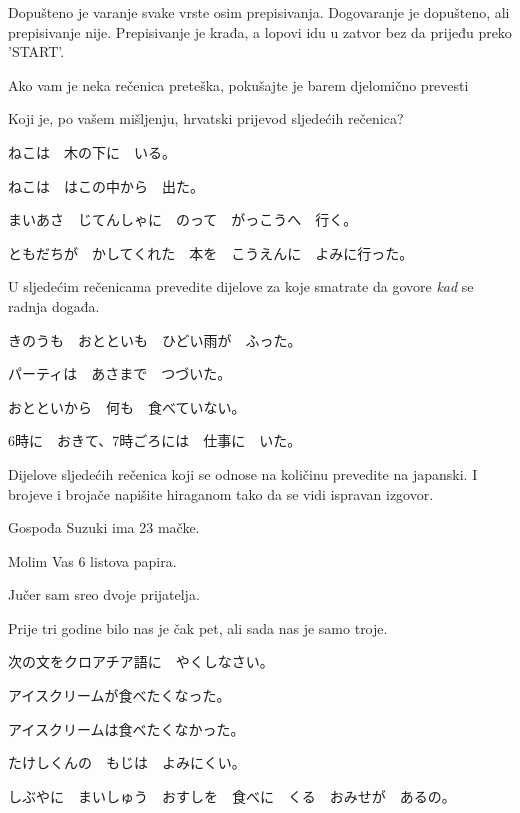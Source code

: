 
\author{Tomislav Mamić}

	
	\noindent
	Dopušteno je varanje svake vrste osim prepisivanja. Dogovaranje je dopušteno, ali prepisivanje nije. Prepisivanje je krađa, a lopovi idu u zatvor bez da prijeđu preko 'START'.
	
	\noindent
	Ako vam je neka rečenica preteška, pokušajte je barem djelomično prevesti
	
	\begin{mondai}{Koji je, po vašem mišljenju, hrvatski prijevod sljedećih rečenica?}
		\item ねこは　木の下に　いる。
		\item ねこは　はこの中から　出た。
		\item まいあさ　じてんしゃに　のって　がっこうへ　行く。
		\item ともだちが　かしてくれた　本を　こうえんに　よみに行った。
	\end{mondai}

	\begin{mondai}{U sljedećim rečenicama prevedite dijelove za koje smatrate da govore \textit{kad} se radnja događa.}
		\item きのうも　おとといも　ひどい雨が　ふった。
		\item パーティは　あさまで　つづいた。
		\item おとといから　何も　食べていない。
		\item 6時に　おきて、7時ごろには　仕事に　いた。
	\end{mondai}

	\begin{mondai}{Dijelove sljedećih rečenica koji se odnose na količinu prevedite na japanski. I brojeve i brojače napišite hiraganom tako da se vidi ispravan izgovor.}
		\item Gospođa Suzuki ima 23 mačke.
		\item Molim Vas 6 listova papira.
		\item Jučer sam sreo dvoje prijatelja.
		\item Prije tri godine bilo nas je čak pet, ali sada nas je samo troje.
	\end{mondai}

	\begin{mondai}{次の文をクロアチア語に　やくしなさい。}
		\item アイスクリームが食べたくなった。
		\item アイスクリームは食べたくなかった。
		\item たけしくんの　もじは　よみにくい。
		\item しぶやに　まいしゅう　おすしを　食べに　くる　おみせが　あるの。
	\end{mondai}
	
